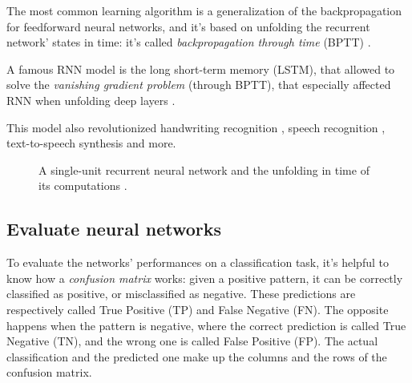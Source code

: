 The most common learning algorithm is a generalization of the backpropagation for feedforward neural networks, and it's based on unfolding the recurrent network' states in time: it's called \textit{backpropagation through time} (BPTT) \cite{Wer88}.
\bigbreak

A famous RNN model is the long short-term memory (LSTM), that allowed to solve the \textit{vanishing gradient problem} (through BPTT), that especially affected RNN when unfolding deep layers \cite{Pas12}.

This model also revolutionized handwriting recognition \cite{Fer07, Gra09}, speech recognition \cite{Li15}, text-to-speech synthesis \cite{Fan15} and more.

\begin{center}
	\begin{figure}[ht!]
		\caption{A single-unit recurrent neural network and the unfolding in time of its computations \cite{WikipediaRNNunfold}.}
	\end{figure}
\end{center}

\subsection{Evaluate neural networks} \label{Evaluate neural networks}
To evaluate the networks' performances on a classification task, it's helpful to know how a \textit{confusion matrix} works: given a positive pattern, it can be correctly classified as positive, or misclassified as negative. These predictions are respectively called True Positive (TP) and False Negative (FN). The opposite happens when the pattern is negative, where the correct prediction is called True Negative (TN), and the wrong one is called False Positive (FP). The actual classification and the predicted one make up the columns and the rows of the confusion matrix.

